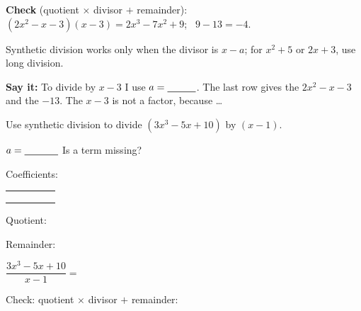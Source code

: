 \textbf{Check} (quotient $\times$ divisor $+$ remainder): $(2x^2-x-3)(x-3)=2x^3-7x^2+9$; \ $9-13=-4$. \checkmark

{\small Synthetic division works only when the divisor is $x-a$; for $x^2+5$ or $2x+3$, use long division.}

\textbf{Say it:} To divide by $x-3$ I use $a=\blank[1cm]$. The last row gives the \blank[2.2cm] $2x^2-x-3$ and the \blank[2.2cm] $-13$. The \blank[2cm] $x-3$ is not a factor, because \dots
\lines[1]

\newpage
{}
Use synthetic division to divide $(3x^3-5x+10)$ by $(x-1)$.

\begin{minipage}[t]{0.50\textwidth}
\vspace{0pt}
$a=\blank[1.2cm]$ \qquad Is a term missing? \blank[1.6cm]

Coefficients: \blank[4.6cm]

\vspace{8pt}
\begin{tabular}{A|CCCC}
\sdstrut\phantom{-1} & & & & \\
\sdstrut & & & & \\ 
\sdstrut & & & & \\
\end{tabular}
\end{minipage}\hfill
\begin{minipage}[t]{0.46\textwidth}
\vspace{0pt}
Quotient: \blank[4.2cm]

\vspace{6pt}
Remainder: \blank[3.8cm]

\vspace{6pt}
$\dfrac{3x^3-5x+10}{x-1}=$ \blank[3.4cm]

\vspace{6pt}
Check: quotient $\times$ divisor $+$ remainder:
\lines[2]
\end{minipage}

\vspace{4pt}

